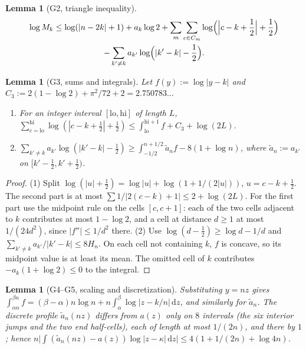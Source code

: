 \documentclass{amsart}
\newtheorem{lemma}[theorem]{Lemma}
\theoremstyle{definition}
\theoremstyle{remark}
\numberwithin{equation}{section}
\newcommand{\dd}{\,\mathrm{d}}
\begin{document}
\begin{lemma}[G2, triangle inequality]\label{lem:G2}
\begin{multline*}
  \log M_k\le\log(|n-2k|+1)+a_k\log2+\sum_m\sum_{c\in C_m}\log\Bigl(\Bigl|c-k+\frac12\Bigr|+\frac12\Bigr)\\
  -\sum_{k'\ne k}a_{k'}\log\Bigl(|k'-k|-\frac12\Bigr).
\end{multline*}
\end{lemma}

\begin{lemma}[G3, sums and integrals]\label{lem:G3}
Let $f(y):=\log|y-k|$ and $C_3:=2(1-\log2)+\pi^2/72+2=2.750783\ldots$
\begin{enumerate}
\item[(1)] For an integer interval $[\mathrm{lo},\mathrm{hi}]$ of length $L$,
  $\sum_{c=\mathrm{lo}}^{\mathrm{hi}}\log(|c-k+\frac12|+\frac12)\le\int_{\mathrm{lo}}^{\mathrm{hi}+1}f+C_3+\log(2L)$.
\item[(2)] $\sum_{k'\ne k}a_{k'}\log(|k'-k|-\frac12)\ge\int_{-1/2}^{n+1/2}\tilde a_nf-8(1+\log n)$,
  where $\tilde a_n:=a_{k'}$ on $[k'-\frac12,k'+\frac12)$.
\end{enumerate}
\end{lemma}

\begin{proof}
(1) Split $\log(|u|+\frac12)=\log|u|+\log(1+1/(2|u|))$, $u=c-k+\frac12$. The
second part is at most $\sum1/|2(c-k)+1|\le2+\log(2L)$. For the first part
use the midpoint rule on the cells $[c,c+1]$: each of the two cells adjacent
to $k$ contributes at most $1-\log2$, and a cell at distance $d\ge1$ at most
$1/(24d^2)$, since $|f''|\le1/d^2$ there.
(2) Use $\log(d-\frac12)\ge\log d-1/d$ and
$\sum_{k'\ne k}a_{k'}/|k'-k|\le8H_n$. On each cell not containing $k$, $f$ is
concave, so its midpoint value is at least its mean. The omitted cell of $k$
contributes $-a_k(1+\log2)\le0$ to the integral.
\end{proof}

\begin{lemma}[G4--G5, scaling and discretization]\label{lem:G45}
Substituting $y=nz$ gives
$\int_{\alpha n}^{\beta n}f=(\beta-\alpha)n\log n+n\int_\alpha^\beta\log|z-k/n|\dd z$,
and similarly for $\tilde a_n$. The discrete profile $\tilde a_n(nz)$ differs
from $a(z)$ only on $8$ intervals (the six interior jumps and the two end
half-cells), each of length at most $1/(2n)$, and there by $1$; hence
$n\bigl|\int(\tilde a_n(nz)-a(z))\log|z-\kappa|\dd z\bigr|\le4(1+1/(2n)+\log4n)$.
\end{lemma}
\end{document}

